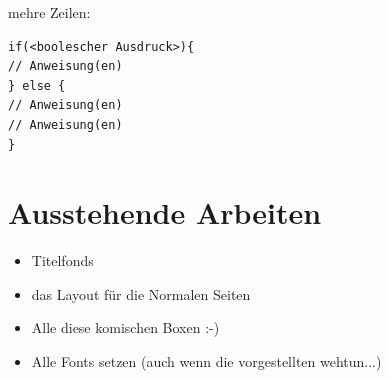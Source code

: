 mehre Zeilen:
\begin{lstlisting}
if(<boolescher Ausdruck>){
// Anweisung(en)
} else {
// Anweisung(en)
// Anweisung(en)
}
\end{lstlisting}

\section{Ausstehende Arbeiten} \label{sec:AusstehendeArbeiten}

\begin{itemize}
	\item Titelfonds
	\item das Layout für die \glqq Normalen\grqq{} Seiten
	\item Alle diese komischen Boxen :-)
	\item Alle Fonts setzen (auch wenn die vorgestellten wehtun...)
\end{itemize}

\blindtext[5]

